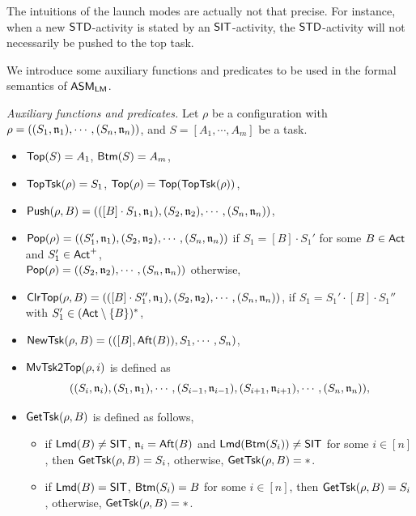 The intuitions of the launch modes are actually not that precise. For instance, when a new $\mathsf{STD}$-activity is stated by an $\mathsf{SIT}$-activity, the $\mathsf{STD}$-activity will not necessarily be pushed to the top task. 

We introduce some auxiliary functions and predicates to be used in the formal semantics of $\textsf{ASM}_\textsf{LM}$.

\emph{Auxiliary functions and predicates.} 
Let $\rho$ be a configuration with $\rho = ((S_1,\mathfrak{n}_1),\cdots, (S_n,\mathfrak{n}_n))$, and $S=[A_1, \cdots, A_m]$ be a task. 
\begin{itemize}
	\item $\mathsf{Top}(S) = A_1$, $\mathsf{Btm}(S) = A_m$,
	\item $\mathsf{TopTsk}(\rho) = S_1$, $\mathsf{Top}(\rho) = \mathsf{Top}(\mathsf{TopTsk}(\rho))$, 
	\item $\mathsf{Push}(\rho, B) = (([B]\cdot S_1,\mathfrak{n}_1),(S_2,\mathfrak{n}_2),\cdots,(S_n,\mathfrak{n}_n))$,
	\item $\mathsf{Pop}(\rho) = ((S_1',\mathfrak{n}_1),(S_2,\mathfrak{n}_2), \cdots, (S_n,\mathfrak{n}_n))$ if $S_1=[B]\cdot S_1'$ for some $B\in{\sf Act}$ and $S_1'\in{\sf Act}^+$,\\ $\mathsf{Pop}(\rho) = ((S_2,\mathfrak{n}_2),\cdots,(S_n,\mathfrak{n}_n))$ otherwise,
	\item $\mathsf{ClrTop}(\rho, B) = (([B]\cdot S_1'',\mathfrak{n}_1), (S_2,\mathfrak{n}_2), \cdots, (S_n,\mathfrak{n}_n))$, if $S_1=S_1'\cdot[B]\cdot S_1''$ with $S_1'\in ({\sf Act}\setminus\{B\})^*$,
	\item $\mathsf{NewTsk}(\rho, B) = (([B],{\sf Aft}(B)), S_1, \cdots, S_n)$,
	\item $\mathsf{MvTsk2Top}(\rho, i)$ is defined as 
	$$((S_i,\mathfrak{n}_i), (S_1,\mathfrak{n}_1), \cdots, (S_{i-1},\mathfrak{n}_{i-1}), (S_{i+1},\mathfrak{n}_{i+1}), \cdots, (S_n,\mathfrak{n}_n)),$$
    \item $\mathsf{GetTsk}(\rho, B)$ is defined as follows,
     \begin{itemize}
     \item if ${\sf Lmd}(B)\neq{\sf SIT}$, $\mathfrak{n}_i={\sf Aft}(B)$ and ${\sf Lmd}(\mathsf{Btm}(S_i)) \neq {\sf SIT}$ for some $i \in [n]$,  then $\mathsf{GetTsk}(\rho, B) = S_i$, otherwise, $\mathsf{GetTsk}(\rho, B) = *$.
    \item if ${\sf Lmd}(B) = {\sf SIT}$, $\mathsf{Btm}(S_i)=B$ for some $i \in [n]$, then $\mathsf{GetTsk}(\rho, B) = S_i$, otherwise, $\mathsf{GetTsk}(\rho, B) = *$.
    \end{itemize}
\end{itemize}

